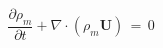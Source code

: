\begin{equation}
\label{eq:vof_momentum}
\frac{\partial \rho_m}{\partial t} + \nabla \cdot (\rho_m \bm{U})\,  =\,  0
\end{equation}